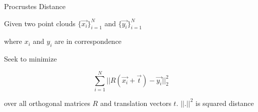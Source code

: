\documentclass{beamer}
\begin{document}
\begin{frame}{Procrustes Distance}

Given two point clouds $\{\vec{x_i}\}_{i=1}^N$ and $\{\vec{y_i}\}_{i=1}^N$

where $x_i$ and $y_i$ are in correspondence

Seek to minimize

\[ \sum_{i=1}^N ||R(\vec{x_i} + \vec{t}) - \vec{y_i}||_2^2 \]

over all orthogonal matrices $R$ and translation vectors $t$.  $||.||^2$ is squared distance

\end{frame}
\end{document}

